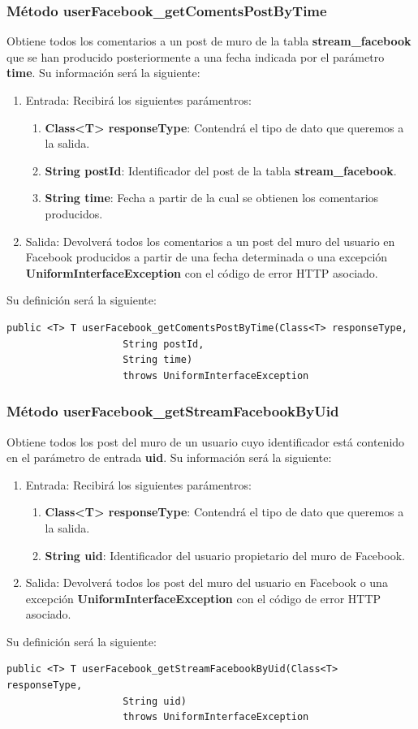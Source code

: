 \subsubsection{Método userFacebook\_getComentsPostByTime}
Obtiene todos los comentarios a un post de muro de la tabla \textbf{stream\_facebook} que se han producido posteriormente a una fecha indicada por el parámetro \textbf{time}. Su información será la siguiente:
\begin{enumerate}
\item Entrada: Recibirá los siguientes parámentros:
\begin{enumerate}
\item \textbf{Class<T> responseType}: Contendrá el tipo de dato que queremos a la salida.
\item \textbf{String postId}: Identificador del post de la tabla \textbf{stream\_facebook}.
\item \textbf{String time}: Fecha a partir de la cual se obtienen los comentarios producidos.
\end{enumerate}
\item Salida: Devolverá todos los comentarios a un post del muro del usuario en Facebook producidos a partir de una fecha determinada o una excepción \textbf{UniformInterfaceException} con el código de error HTTP asociado.
\end{enumerate}
\bigskip
\par
Su definición será la siguiente:
\begin{verbatim}public <T> T userFacebook_getComentsPostByTime(Class<T> responseType, 
					String postId, 
					String time) 
					throws UniformInterfaceException\end{verbatim}

\subsubsection{Método userFacebook\_getStreamFacebookByUid}
Obtiene todos los post del muro de un usuario cuyo identificador está contenido en el parámetro de entrada \textbf{uid}. Su información será la siguiente:
\begin{enumerate}
\item Entrada: Recibirá los siguientes parámentros:
\begin{enumerate}
\item \textbf{Class<T> responseType}: Contendrá el tipo de dato que queremos a la salida.
\item \textbf{String uid}: Identificador del usuario propietario del muro de Facebook.
\end{enumerate}
\item Salida: Devolverá todos los post del muro del usuario en Facebook o una excepción \textbf{UniformInterfaceException} con el código de error HTTP asociado.
\end{enumerate}
\bigskip
\par
Su definición será la siguiente:
\begin{verbatim}public <T> T userFacebook_getStreamFacebookByUid(Class<T> responseType, 
					String uid) 
					throws UniformInterfaceException\end{verbatim}


